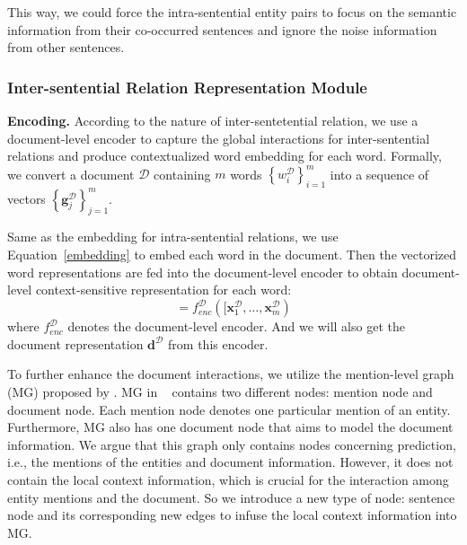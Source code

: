 \documentclass[11pt,a4paper]{article}
\begin{document}
This way, we could force the intra-sentential entity pairs to focus on the semantic information from their co-occurred sentences and ignore the noise information from other sentences.



\subsubsection{Inter-sentential Relation Representation Module\label{sssec:inter}}

\textbf{Encoding.} According to the nature of inter-sentetential relation, we use a document-level encoder to capture the global interactions for inter-sentential relations and produce contextualized word embedding for each word. Formally, we convert a document $\mathcal{D}$ containing $m$ words  $\left\{w^{\mathcal{D}}_i\right\}^{m}_{i=1}$ into a sequence of vectors $\left\{\textbf{{g}}^{\mathcal{D}}_{j}\right\}^{m}_{j=1}$.

Same as the embedding for intra-sentential relations, we use Equation~\ref{embedding} to embed each word in the document. Then the vectorized word representations are fed into the document-level encoder to obtain document-level context-sensitive representation for each word:
\begin{equation}
[\textbf{g}^{\mathcal{D}}_{1}, \ldots, \textbf{g}^{\mathcal{D}}_{m}] = f_{enc}^{\mathcal{D}}([\textbf{x}^{\mathcal{D}}_1, \ldots, \textbf{x}^{\mathcal{D}}_{m})
\end{equation}
where ${f}_{enc}^{\mathcal{D}}$ denotes the document-level encoder. And we will also get the document representation $\textbf{d}^{\mathcal{D}}$ from this encoder.

To further enhance the document interactions, we utilize the mention-level graph (MG) proposed by \citet{GAIN}. MG in ~\citet{GAIN} contains two different nodes: mention node and document node. Each mention node denotes one particular mention of an entity. Furthermore, MG also has one document node that aims to model the document information. We argue that this graph only contains nodes concerning prediction, i.e., the mentions of the entities and document information. However, it does not contain the local context information, which is crucial for the interaction among entity mentions and the document. So we introduce a new type of node: sentence node and its corresponding new edges to infuse the local context information into MG.
\end{document}
